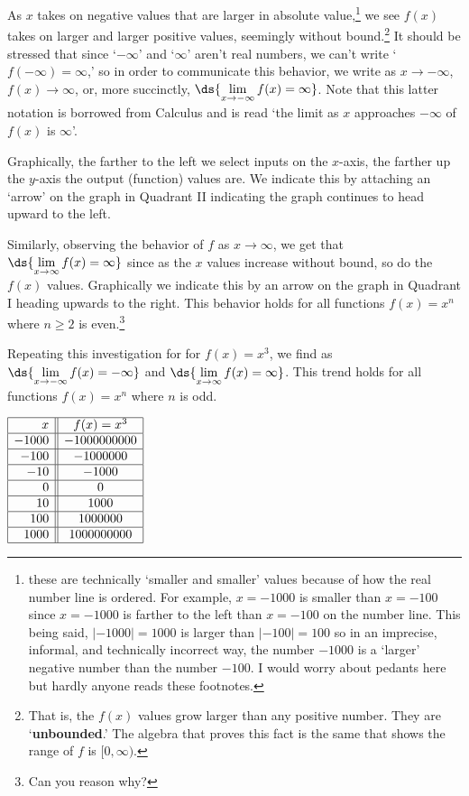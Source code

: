 \documentclass{ximera}
\begin{document}
As $x$ takes on negative values that are larger in absolute value,\footnote{these are technically `smaller and smaller' values because of how the real number line is ordered. For example, $x = -1000$ is smaller than $x = -100$ since $x = -1000$ is farther to the left than $x = -100$ on the number line. This being said, $|-1000| = 1000$ is larger than $|-100| = 100$ so in an imprecise, informal, and technically incorrect way, the number $-1000$ is a `larger' negative number than the number $-100$.  I would worry about pedants here but  hardly anyone reads these footnotes.}  we see $f(x)$ takes on larger and larger positive values, seemingly without bound.\footnote{That is, the $f(x)$ values grow larger than any positive number.  They are `\textbf{unbounded}.'  The algebra that proves this fact  is the same that shows the range of $f$ is $[0, \infty)$.}   It should be stressed that since `$-\infty$' and `$\infty$' aren't real numbers, we can't write `$f(-\infty) = \infty$,'  so in order to communicate this behavior, we write as $x \rightarrow -\infty$, $f(x) \rightarrow \infty$, or, more succinctly, $\ds{ \lim_{x \rightarrow - \infty} f(x) = \infty}$.  Note that this latter notation is borrowed from Calculus and is read `the limit as $x$ approaches $- \infty$ of $f(x)$ is $\infty$'.  

Graphically, the farther to the left we select inputs on the $x$-axis, the farther up the $y$-axis the output (function) values are.  We indicate this by attaching an  `arrow' on the graph in Quadrant II indicating the graph continues to head upward to the left.  

Similarly, observing the behavior of $f$ as $x \rightarrow \infty$,  we get that   $\ds{ \lim_{x \rightarrow \infty} f(x) = \infty}$ since as the $x$ values increase without bound, so do the $f(x)$ values.  Graphically we indicate this by an arrow on the graph in Quadrant I heading upwards to the right.  This behavior holds for all functions $f(x) = x^n$ where $n \geq 2$ is even.\footnote{Can you reason why?}

Repeating this investigation for  for $f(x) = x^3$,  we find as $\ds{ \lim_{x \rightarrow - \infty} f(x) =  -\infty}$ and $\ds{ \lim_{x \rightarrow \infty} f(x) = \infty}$.  This trend holds for all functions $f(x) = x^n$ where $n$ is odd. 


\begin{center}
$\begin{array}{|r||c|}  \hline

 x &  f(x) = x^3  \\ \hline
 -1000 & -1000000000 \\  \hline
 -100 & -1000000 \\  \hline
 -10 & -1000  \\  \hline
 0 &  0  \\  \hline
 10 & 1000  \\  \hline
 100&  1000000 \\  \hline
 1000 & 1000000000 \\  \hline

\end{array}$
\end{center}
\end{document}
